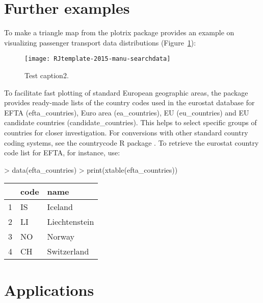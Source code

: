 \section{Further examples}

To make a triangle map from the plotrix \citep{plotrix}
package provides an example on visualizing passenger transport data
distributions (Figure~\ref{fig:plotrix}):

\begin{figure}
\begin{center}
\texttt{[image: RJtemplate-2015-manu-searchdata]}
\end{center}
\caption{Test caption2.}
\label{fig:plotrix}
\end{figure}

To facilitate fast plotting of standard European geographic areas, the package provides ready-made lists of the country codes used in the eurostat database for EFTA (efta\_countries), Euro area (ea\_countries), EU (eu\_countries) and EU candidate countries (candidate\_countries). This helps to select specific groups of countries for closer investigation. For conversions with other standard country coding systems, see the countrycode R package \citep{countrycode}. To retrieve the eurostat country code list for EFTA, for instance, use:

\begin{Schunk}
\begin{Sinput}
> data(efta_countries)
> print(xtable(efta_countries))
\end{Sinput}
% latex table generated in R 3.2.2 by xtable 1.8-0 package
% Mon Nov 23 13:41:58 2015
\begin{table}[ht]
\centering
\begin{tabular}{rll}
  \hline
 & code & name \\ 
  \hline
1 & IS & Iceland \\ 
  2 & LI & Liechtenstein \\ 
  3 & NO & Norway \\ 
  4 & CH & Switzerland \\ 
   \hline
\end{tabular}
\end{table}\end{Schunk}


\section{Applications}

